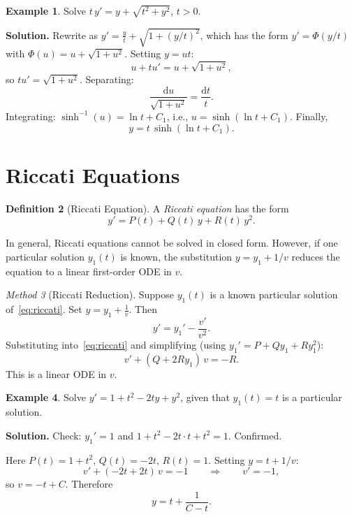 \documentclass[12pt,a4paper,openany]{book}
\theoremstyle{definition}
\newtheorem{definition}{Definition}[chapter]
\newtheorem{example}[definition]{Example}
\theoremstyle{plain}
\theoremstyle{remark}
\newtheorem{method}[definition]{Method}
\newcommand{\dd}{\mathrm{d}}
\begin{document}
\begin{example}
\label{ex:homogeneous-1}
Solve $t\,y' = y + \sqrt{t^2 + y^2}$, $t > 0$.

\textbf{Solution.} Rewrite as $y' = \frac{y}{t} + \sqrt{1 + (y/t)^2}$, which has the form $y' = \Phi(y/t)$ with $\Phi(u) = u + \sqrt{1+u^2}$. Setting $y = ut$:
\[
  u + tu' = u + \sqrt{1+u^2},
\]
so $tu' = \sqrt{1+u^2}$. Separating:
\[
  \frac{\dd u}{\sqrt{1+u^2}} = \frac{\dd t}{t}.
\]
Integrating: $\sinh^{-1}(u) = \ln t + C_1$, i.e., $u = \sinh(\ln t + C_1)$. Finally,
\[
  y = t\,\sinh(\ln t + C_1).
\]
\end{example}

\section{Riccati Equations}
\label{sec:riccati}

\begin{definition}[Riccati Equation]
\label{def:riccati}
A \emph{Riccati equation} has the form
\begin{equation}\label{eq:riccati}
  y' = P(t) + Q(t)\,y + R(t)\,y^2.
\end{equation}
\end{definition}

In general, Riccati equations cannot be solved in closed form. However, if one particular solution $y_1(t)$ is known, the substitution $y = y_1 + 1/v$ reduces the equation to a linear first-order ODE in $v$.

\begin{method}[Riccati Reduction]
\label{meth:riccati}
Suppose $y_1(t)$ is a known particular solution of~\eqref{eq:riccati}. Set $y = y_1 + \frac{1}{v}$. Then
\[
  y' = y_1' - \frac{v'}{v^2}.
\]
Substituting into~\eqref{eq:riccati} and simplifying (using $y_1' = P + Qy_1 + Ry_1^2$):
\begin{equation}\label{eq:riccati-reduced}
  v' + (Q + 2Ry_1)\,v = -R.
\end{equation}
This is a linear ODE in $v$.
\end{method}

\begin{example}
\label{ex:riccati-1}
Solve $y' = 1 + t^2 - 2ty + y^2$, given that $y_1(t) = t$ is a particular solution.

\textbf{Solution.} Check: $y_1' = 1$ and $1 + t^2 - 2t\cdot t + t^2 = 1$. Confirmed.

Here $P(t)=1+t^2$, $Q(t)=-2t$, $R(t)=1$. Setting $y = t + 1/v$:
\[
  v' + (-2t + 2t)\,v = -1 \qquad\Longrightarrow\qquad v' = -1,
\]
so $v = -t + C$. Therefore
\[
  y = t + \frac{1}{C - t}.
\]
\end{example}
\end{document}
